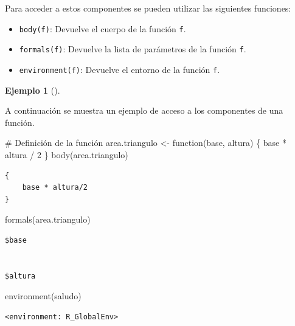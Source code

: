 \documentclass[
  a4paper,
]{scrreport}
\newenvironment{Shaded}{\begin{snugshade}}{\end{snugshade}}
\newcommand{\CommentTok}[1]{\textcolor[rgb]{0.37,0.37,0.37}{#1}}
\newcommand{\ControlFlowTok}[1]{\textcolor[rgb]{0.00,0.23,0.31}{#1}}
\newcommand{\DecValTok}[1]{\textcolor[rgb]{0.68,0.00,0.00}{#1}}
\newcommand{\FunctionTok}[1]{\textcolor[rgb]{0.28,0.35,0.67}{#1}}
\newcommand{\NormalTok}[1]{\textcolor[rgb]{0.00,0.23,0.31}{#1}}
\newcommand{\OtherTok}[1]{\textcolor[rgb]{0.00,0.23,0.31}{#1}}
\newcommand{\SpecialCharTok}[1]{\textcolor[rgb]{0.37,0.37,0.37}{#1}}
\providecommand{\tightlist}{%
  \setlength{\itemsep}{0pt}\setlength{\parskip}{0pt}}\usepackage{longtable,booktabs,array}
\theoremstyle{definition}
\theoremstyle{definition}
\newtheorem{example}{Ejemplo}[chapter]
\theoremstyle{remark}
\begin{document}
Para acceder a estos componentes se pueden utilizar las siguientes
funciones:

\begin{itemize}
\tightlist
\item
  \texttt{body(f)}: Devuelve el cuerpo de la función \texttt{f}.
\item
  \texttt{formals(f)}: Devuelve la lista de parámetros de la función
  \texttt{f}.
\item
  \texttt{environment(f)}: Devuelve el entorno de la función \texttt{f}.
\end{itemize}

\leavevmode{}%
\begin{example}[]\label{exm-componentes-funcion}

A continuación se muestra un ejemplo de acceso a los componentes de una
función.

\begin{Shaded}
\begin{Highlighting}[]
\CommentTok{\# Definición de la función}
\NormalTok{area.triangulo }\OtherTok{\textless{}{-}} \ControlFlowTok{function}\NormalTok{(base, altura) \{}
\NormalTok{  base }\SpecialCharTok{*}\NormalTok{ altura }\SpecialCharTok{/} \DecValTok{2}
\NormalTok{\}}
\FunctionTok{body}\NormalTok{(area.triangulo)}
\end{Highlighting}
\end{Shaded}

\begin{verbatim}
{
    base * altura/2
}
\end{verbatim}

\begin{Shaded}
\begin{Highlighting}[]
\FunctionTok{formals}\NormalTok{(area.triangulo)}
\end{Highlighting}
\end{Shaded}

\begin{verbatim}
$base


$altura
\end{verbatim}

\begin{Shaded}
\begin{Highlighting}[]
\FunctionTok{environment}\NormalTok{(saludo)}
\end{Highlighting}
\end{Shaded}

\begin{verbatim}
<environment: R_GlobalEnv>
\end{verbatim}

\end{example}
\end{document}
